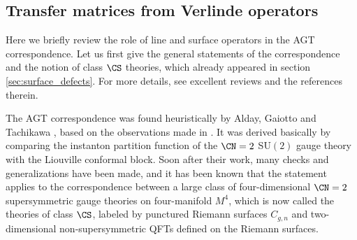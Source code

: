 \subsection{Transfer matrices from Verlinde operators}
\label{sec:Toda}


Here we briefly review  the role of line and surface operators 
in the AGT correspondence. Let us first give the general statements 
of the correspondence and the notion of class $\CS$ theories, 
which already appeared in section \ref{sec:surface_defects}. 
For more details, see excellent reviews \cite{LeFloch:2020uop,Okuda:2014fja,Gukov:2014gja} 
and the references therein. 

The AGT correspondence was found heuristically by Alday, 
Gaiotto and Tachikawa \cite{Alday:2009aq}, based on the observations 
made in \cite{Gaiotto:2009we}. It was derived basically by comparing 
the instanton partition function \cite{Nekrasov:2002qd} of the $\CN =2$ SU$(2)$
gauge theory with the Liouville conformal block. 
Soon after their work, many checks and generalizations have been made, and 
it has been known that the statement applies to the correspondence between a large class
 of four-dimensional $\CN = 2$ supersymmetric gauge theories on four-manifold $M^4$, 
 which is now called the theories of class $\CS$, labeled by punctured Riemann 
surfaces $C_{g,n}$ and two-dimensional non-supersymmetric QFTs defined on the Riemann surfaces. 

